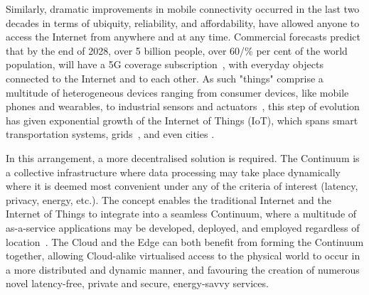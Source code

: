 Similarly, dramatic improvements in mobile connectivity occurred in the last two decades in terms of ubiquity, reliability, and affordability, have allowed anyone to access the Internet from anywhere and at any time.
Commercial forecasts predict that by the end of 2028, over 5 billion people, over $60$/\% per cent of the world population, will have a 5G coverage subscription~\cite{ericsson-5g}, with everyday objects connected to the Internet and to each other. 
As such "things" comprise a multitude of heterogeneous devices ranging from consumer devices, like mobile phones and wearables, to industrial sensors and actuators~\cite{chen2018edge}, this step of evolution has given exponential growth of the Internet of Things (IoT), which spans smart transportation systems, grids~\cite{mugarza2019dynamic}, and even cities \cite{cabrini2021enabling}.

In this arrangement, a more decentralised solution is required. The Continuum is a collective infrastructure where data processing may take place dynamically where it is deemed most convenient under any of the criteria of interest (latency, privacy, energy, etc.). The concept enables the traditional Internet and the Internet of Things to integrate into a seamless Continuum, where a multitude of as-a-service applications may be developed, deployed, and employed regardless of location~\cite{beckman2020harnessing}. The Cloud and the Edge can both benefit from forming the Continuum together, allowing Cloud-alike virtualised access to the physical world to occur in a more distributed and dynamic manner, and favouring the creation of numerous novel latency-free, private and secure, energy-savvy services.

